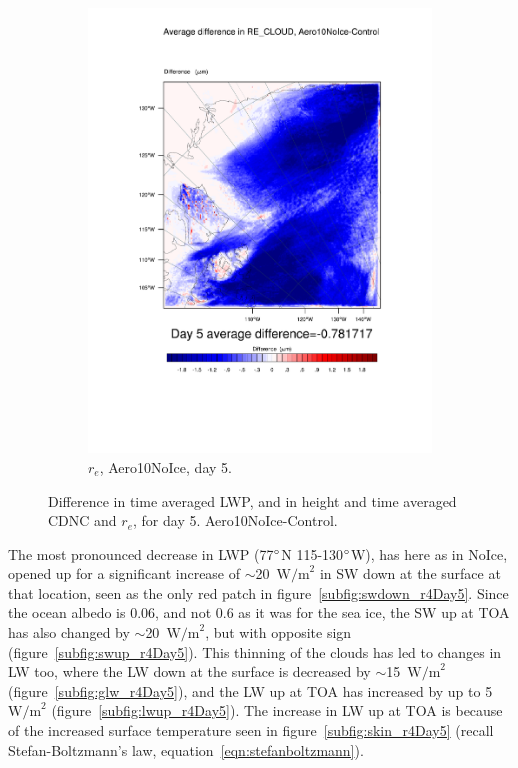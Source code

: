 \begin{figure}[hb]
	\begin{subfigure}{0.48\textwidth}
		\centering
		\includegraphics[width=\textwidth]{results/aero10ni/diff_Aero10NoIce_RE_CLOUD_Day5.pdf}
		\caption{$r_e$, Aero10NoIce, day 5.}
		\label{subfig:recloudr4Day5}
	\end{subfigure}
\caption{Difference in time averaged LWP, and in height and time averaged CDNC and $r_e$, for day 5. Aero10NoIce-Control.}
\label{fig:lwpcdncre_r4Day5}
\end{figure}

The most pronounced decrease in LWP (77$\degree$N 115-130$\degree$W), has here as in NoIce, opened up for a significant increase of $\sim$20~$\text{W/m}^2$ in SW down at the surface at that location, seen as the only red patch in figure~\ref{subfig:swdown_r4Day5}. Since the ocean albedo is 0.06, and not 0.6 as it was for the sea ice, the SW up at TOA has also changed by $\sim$20~$\text{W/m}^2$, but with opposite sign (figure~\ref{subfig:swup_r4Day5}). This thinning of the clouds has led to changes in LW too, where the LW down at the surface is decreased by $\sim$15~$\text{W/m}^2$ (figure~\ref{subfig:glw_r4Day5}), and the LW up at TOA has increased by up to 5~$\text{W/m}^2$ (figure~\ref{subfig:lwup_r4Day5}). The increase in LW up at TOA is because of the increased surface temperature seen in figure~\ref{subfig:skin_r4Day5} (recall Stefan-Boltzmann's law, equation~\ref{eqn:stefanboltzmann}).

